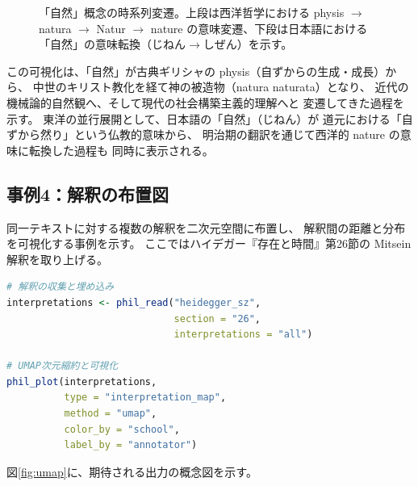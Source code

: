 \documentclass[a4paper,11pt]{ltjsarticle}
\begin{document}
\begin{figure}[H]
\caption{「自然」概念の時系列変遷。上段は西洋哲学における physis $\to$ natura $\to$ Natur $\to$ nature の意味変遷、下段は日本語における「自然」の意味転換（じねん$\to$しぜん）を示す。}
\label{fig:timeline}
\end{figure}

この可視化は、「自然」が古典ギリシャの physis（自ずからの生成・成長）から、
中世のキリスト教化を経て神の被造物（natura naturata）となり、
近代の機械論的自然観へ、そして現代の社会構築主義的理解へと
変遷してきた過程を示す。
東洋の並行展開として、日本語の「自然」（じねん）が
道元における「自ずから然り」という仏教的意味から、
明治期の翻訳を通じて西洋的 nature の意味に転換した過程も
同時に表示される。

\subsection{事例4：解釈の布置図}\label{sec:case4}

同一テキストに対する複数の解釈を二次元空間に布置し、
解釈間の距離と分布を可視化する事例を示す。
ここではハイデガー『存在と時間』第26節の Mitsein 解釈を取り上げる。

\begin{lstlisting}[language=R,caption=解釈の布置図]
# 解釈の収集と埋め込み
interpretations <- phil_read("heidegger_sz",
                             section = "26",
                             interpretations = "all")

# UMAP次元縮約と可視化
phil_plot(interpretations,
          type = "interpretation_map",
          method = "umap",
          color_by = "school",
          label_by = "annotator")
\end{lstlisting}

図\ref{fig:umap}に、期待される出力の概念図を示す。
\end{document}
